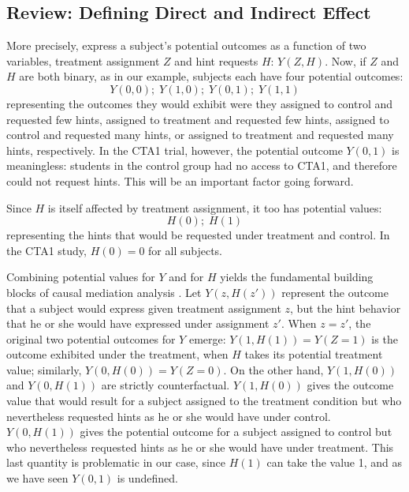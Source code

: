 \documentclass{article}\usepackage[]{graphicx}\usepackage[]{color}
\begin{document}
\subsection{Review: Defining Direct and Indirect Effect}
More precisely, express a subject's potential outcomes as a function
of two variables, treatment assignment $Z$ and hint requests $H$:
$Y(Z,H)$.
Now, if $Z$ and $H$ are both binary, as in our example, subjects
each have four potential outcomes:
\begin{equation*}
Y(0,0);\;Y(1,0);\;Y(0,1);\;Y(1,1)
\end{equation*}
representing the outcomes they would exhibit were they assigned to
control and requested few hints, assigned to
treatment and requested few hints, assigned to control and requested
many hints, or assigned to treatment and requested many hints, respectively.
In the CTA1 trial, however, the potential outcome $Y(0,1)$ is
meaningless: students in the control group had no access to CTA1, and
therefore could not request hints.
This will be an important factor going forward.

Since $H$ is itself affected by treatment assignment, it
too has potential values:
\begin{equation*}
H(0);\;H(1)
\end{equation*}
representing the hints that would be requested under treatment and
control.
In the CTA1 study, $H(0)=0$ for all subjects.

Combining potential values for $Y$ and for $H$ yields the fundamental
building blocks of causal mediation analysis
\citep[e.g.][]{vanderweele2015explanation,sales2017mediation}.
Let $Y(z,H(z'))$
represent the outcome that a subject would express given treatment
assignment $z$, but the hint behavior that he or she would have
expressed under assignment $z'$.
When $z=z'$, the original two potential outcomes for $Y$ emerge:
$Y(1,H(1))=Y(Z=1)$ is the outcome exhibited under the treatment, when $H$
takes its potential treatment value; similarly, $Y(0,H(0))=Y(Z=0)$. On
the other hand, $Y(1,H(0))$ and $Y(0,H(1))$ are strictly
counterfactual. $Y(1,H(0))$ gives the outcome value
that would result for a subject assigned to the treatment condition
but who nevertheless requested hints as he or she would have under
control. $Y(0,H(1))$ gives the potential outcome for a subject
assigned to control but who nevertheless requested hints as he or she
would have under treatment.
This last quantity is problematic in our case, since $H(1)$ can take the value 1,
and as we have seen $Y(0,1)$ is undefined.
\end{document}
